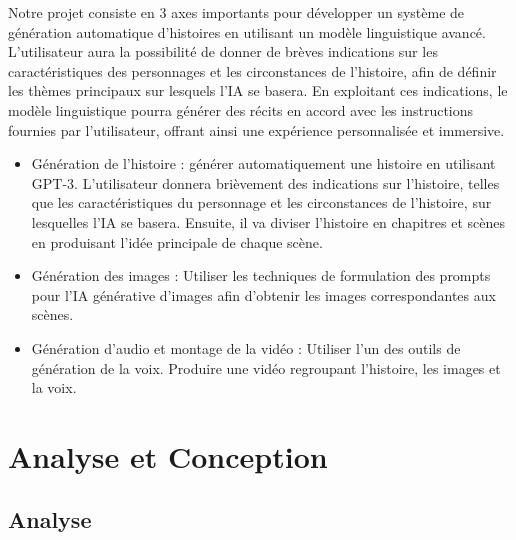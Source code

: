 \documentclass[11,5pt]{report}
\begin{document}
\begin{spacing}{2}
Notre projet consiste en 3 axes importants pour développer un système de génération automatique d'histoires en utilisant un modèle linguistique avancé. L'utilisateur aura la possibilité de donner de brèves indications sur les caractéristiques des personnages et les circonstances de l'histoire, afin de définir les thèmes principaux sur lesquels l'IA se basera. En exploitant ces indications, le modèle linguistique pourra générer des récits en accord avec les instructions fournies par l'utilisateur, offrant ainsi une expérience personnalisée et immersive.

\begin{itemize}[label=\textbullet]
\item Génération de l'histoire : générer automatiquement une histoire en utilisant GPT-3. L'utilisateur donnera brièvement des indications sur l'histoire, telles que les caractéristiques du personnage et les circonstances de l'histoire, sur lesquelles l'IA se basera. Ensuite, il va diviser l'histoire en chapitres et scènes en produisant l'idée principale de chaque scène.
\item Génération des images : Utiliser les techniques de formulation des prompts pour l'IA générative d'images afin d'obtenir les images correspondantes aux scènes.
\item Génération d'audio et montage de la vidéo : Utiliser l'un des outils de génération de la voix. Produire une vidéo regroupant l'histoire, les images et la voix.
\end{itemize}


\chapter{Analyse et Conception}

\par


\section{Analyse}

\end{spacing}
\end{document}
